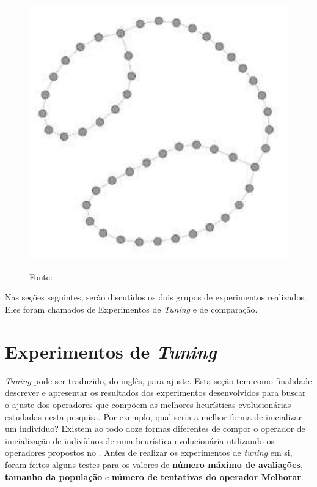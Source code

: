 \begin{figure}[tp]
\begin{minipage}{0.5\textwidth}
		\label{fig:islands}
	\end{minipage}
	\begin{minipage}{0.5\textwidth}
		\centering
		\includegraphics[width=\linewidth]{images/mapa_cicles_corridor.png}
		\label{fig:cicles_corridor}
	\end{minipage}
	\caption*{Fonte: \citep{sampaiophd}}
	\label{fig:mapas}
\end{figure}

Nas seções seguintes, serão discutidos os dois grupos de experimentos 
realizados. Eles foram chamados de Experimentos de \textit{Tuning} e de 
comparação.

\section{Experimentos de \textit{Tuning}}

\textit{Tuning} pode ser traduzido, do inglês, para ajuste. Esta seção tem como 
finalidade descrever e apresentar os resultados dos experimentos desenvolvidos 
para buscar o ajuste dos operadores que compõem as melhores heurísticas 
evolucionárias estudadas nesta pesquisa. Por exemplo, qual seria a melhor forma 
de inicializar um indivíduo? Existem ao todo doze formas diferentes de compor 
o operador de inicialização de indivíduos de uma heurística evolucionária 
utilizando os operadores propostos no . Antes de 
realizar os experimentos de \textit{tuning} em si, foram feitos alguns testes 
para os valores de \textbf{número máximo de avaliações}, 
\textbf{tamanho da população} e \textbf{número de tentativas do operador Melhorar}.

